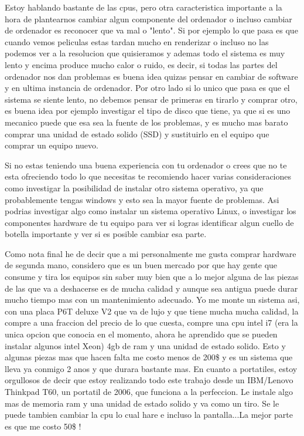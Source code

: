 Estoy hablando bastante de las cpus, pero otra caracteristica importante a la hora de plantearnos cambiar algun componente del ordenador o incluso cambiar de ordenador es reconocer que va mal o "lento". Si por ejemplo lo que pasa es que cuando vemos peliculas estas tardan mucho en renderizar o incluso no las podemos ver a la resolucion que quisieramos y ademas todo el sistema es muy lento y encima produce mucho calor o ruido, es decir, si todas las partes del ordenador nos dan problemas es buena idea quizas pensar en cambiar de software y en ultima instancia de ordenador. Por otro lado si lo unico que pasa es que el sistema se siente lento, no debemos pensar de primeras en tirarlo y comprar otro, es buena idea por ejemplo investigar el tipo de disco que tiene, ya que si es uno mecanico puede que esa sea la fuente de los problemas, y es mucho mas barato comprar una unidad de estado solido (SSD) y sustituirlo en el equipo que comprar un equipo nuevo. 

Si no estas teniendo una buena experiencia con tu ordenador o crees que no te esta ofreciendo todo lo que necesitas te recomiendo hacer varias consideraciones como investigar la posibilidad de instalar otro sistema operativo, ya que probablemente tengas windows y esto sea la mayor fuente de problemas. Asi podrias investigar algo como instalar un sistema operativo Linux, o investigar los componentes hardware de tu equipo para ver si logras identificar algun cuello de botella importante y ver si es posible cambiar esa parte.

Como nota final he de decir que a mi personalmente me gusta comprar hardware de segunda mano, considero que es un buen mercado por que hay gente que consume y tira los equipos sin saber muy bien que a lo mejor alguna de las piezas de las que va a deshacerse es de mucha calidad y aunque sea antigua puede durar mucho tiempo mas con un mantenimiento adecuado. Yo me monte un sistema asi, con una placa P6T deluxe V2 que va de lujo y que tiene mucha mucha calidad, la compre a una fraccion del precio de lo que cuesta, compre una cpu intel i7 (era la unica opcion que conocia en el momento, ahora he aprendido que se pueden instalar algunos intel Xeon) 4gb de ram y una unidad de estado solido. Esto y algunas piezas mas que hacen falta me costo menos de 200\$ y es un sistema que lleva ya conmigo 2 anos y que durara bastante mas. En cuanto a portatiles, estoy orgullosos de decir que estoy realizando todo este trabajo desde un IBM/Lenovo Thinkpad T60, un portatil de 2006, que funciona a la perfeccion. Le instale algo mas de memoria ram y una unidad de estado solido y va como un tiro. Se le puede tambien cambiar la cpu lo cual hare e incluso la pantalla...La mejor parte es que me costo 50\$ !

